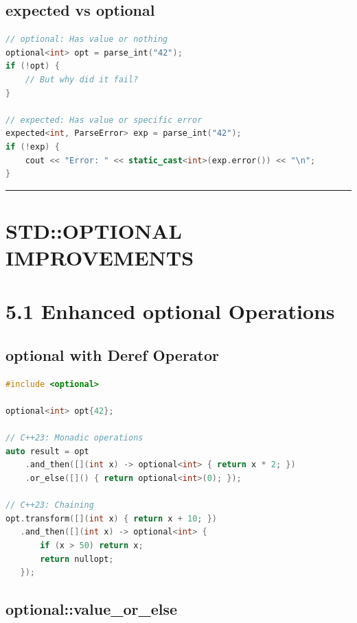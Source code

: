 \hypertarget{expected-vs-optional}{%
\subsection{expected vs optional}\label{expected-vs-optional}}

\begin{lstlisting}[language={C++}]
// optional: Has value or nothing
optional<int> opt = parse_int("42");
if (!opt) {
    // But why did it fail?
}

// expected: Has value or specific error
expected<int, ParseError> exp = parse_int("42");
if (!exp) {
    cout << "Error: " << static_cast<int>(exp.error()) << "\n";
}
\end{lstlisting}

\begin{center}\rule{0.5\linewidth}{0.5pt}\end{center}

\hypertarget{stdoptional-improvements}{%
\section{STD::OPTIONAL IMPROVEMENTS}\label{stdoptional-improvements}}

\hypertarget{enhanced-optional-operations}{%
\section{5.1 Enhanced optional
Operations}\label{enhanced-optional-operations}}

\hypertarget{optional-with-deref-operator}{%
\subsection{optional with Deref
Operator}\label{optional-with-deref-operator}}

\begin{lstlisting}[language={C++}]
#include <optional>

optional<int> opt{42};

// C++23: Monadic operations
auto result = opt
    .and_then([](int x) -> optional<int> { return x * 2; })
    .or_else([]() { return optional<int>(0); });

// C++23: Chaining
opt.transform([](int x) { return x + 10; })
   .and_then([](int x) -> optional<int> {
       if (x > 50) return x;
       return nullopt;
   });
\end{lstlisting}

\hypertarget{optionalvalue_or_else}{%
\subsection{optional::value\_or\_else}\label{optionalvalue_or_else}}

